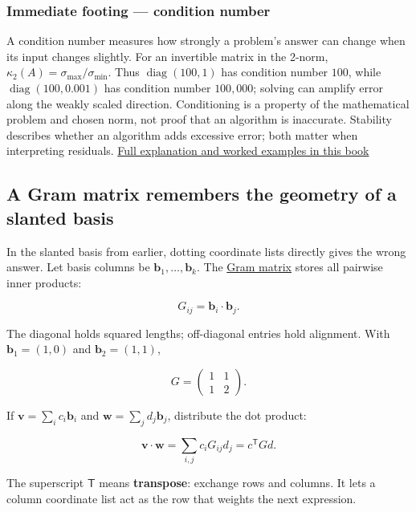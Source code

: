 \subsubsection{Immediate footing --- condition number}\label{01-foundations-i-ch018-immediate-footing-condition-number}

A condition number measures how strongly a problem's answer can change when its input changes slightly. For an invertible matrix in the 2-norm, \(\kappa_2(A)=\sigma_{\max}/\sigma_{\min}\). Thus \(\operatorname{diag}(100,1)\) has condition number \(100\), while \(\operatorname{diag}(100,0.001)\) has condition number \(100{,}000\); solving can amplify error along the weakly scaled direction. Conditioning is a property of the mathematical problem and chosen norm, not proof that an algorithm is inaccurate. Stability describes whether an algorithm adds excessive error; both matter when interpreting residuals. \hyperref[02-foundations-ii-ch024-conditioning-weak-singular-directions-amplify-uncertainty]{Full explanation and worked examples in this book}

\subsection{A Gram matrix remembers the geometry of a slanted basis}\label{01-foundations-i-ch018-a-gram-matrix-remembers-the-geometry-of-a-slanted-basis}

In the slanted basis from earlier, dotting coordinate lists directly gives the wrong answer. Let basis columns be \(\mathbf b_1,\ldots,\mathbf b_k\). The \hyperref[01-foundations-i-ch018-a-gram-matrix-remembers-the-geometry-of-a-slanted-basis]{Gram matrix} stores all pairwise inner products:

\[
G_{ij}=\mathbf b_i\cdot\mathbf b_j.
\]

The diagonal holds squared lengths; off-diagonal entries hold alignment. With \(\mathbf b_1=(1,0)\) and \(\mathbf b_2=(1,1)\),

\[
G=\begin{pmatrix}1&1\\1&2\end{pmatrix}.
\]

If \(\mathbf v=\sum_i c_i\mathbf b_i\) and \(\mathbf w=\sum_jd_j\mathbf b_j\), distribute the dot product:

\[
\mathbf v\cdot\mathbf w
=\sum_{i,j}c_iG_{ij}d_j=c^\mathsf TGd.
\]

The superscript \(\mathsf T\) means \textbf{transpose}: exchange rows and columns. It lets a column coordinate list act as the row that weights the next expression.

